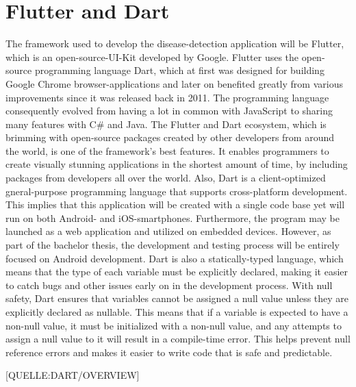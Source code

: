 \section{Flutter and Dart}
The framework used to develop the disease-detection application will be Flutter, which is an open-source-UI-Kit developed by Google. Flutter uses the open-source programming language Dart, which at first was designed for building Google Chrome browser-applications and later on benefited greatly from various improvements since it was released back in 2011. The programming language consequently evolved from having a lot in common with JavaScript to sharing many features with C\# and Java.
The Flutter and Dart ecosystem, which is brimming with open-source packages created by other developers from around the world, is one of the framework's best features. It enables programmers to create visually stunning applications in the shortest amount of time, by including packages from developers all over the world. Also, Dart is a client-optimized gneral-purpose programming language that supports cross-platform development. This implies that this application will be created with a single code base yet will run on both Android- and iOS-smartphones. Furthermore, the program may be launched as a web application and utilized on embedded devices. However, as part of the bachelor thesis, the development and testing process will be entirely focused on Android development. Dart is also a statically-typed language, which means that the type of each variable must be explicitly declared, making it easier to catch bugs and other issues early on in the development process. With null safety, Dart ensures that variables cannot be assigned a null value unless they are explicitly declared as nullable. This means that if a variable is expected to have a non-null value, it must be initialized with a non-null value, and any attempts to assign a null value to it will result in a compile-time error. This helps prevent null reference errors and makes it easier to write code that is safe and predictable.

 [QUELLE:DART/OVERVIEW]



